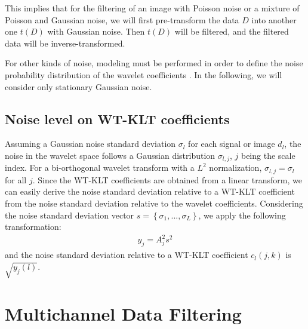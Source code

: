 This implies that for the filtering of an image with Poisson noise or
a mixture of Poisson and Gaussian noise, we will first pre-transform 
the data $D$ into another one $t(D)$ with Gaussian noise. Then $t(D)$ 
will be filtered, and the filtered data will be inverse-transformed.

For other kinds of noise, modeling must be performed in order to 
define the noise probability distribution of the wavelet coefficients 
\cite{starck:book98}.   
In the following, we will consider only stationary Gaussian noise.

\subsection{Noise level on WT-KLT coefficients}
Assuming a Gaussian noise standard deviation $\sigma_l$ for each signal 
or image $d_l$, the noise in the wavelet space follows a Gaussian distribution
$\sigma_{l,j}$, $j$ being the scale index. For a bi-orthogonal wavelet 
transform with a $L^2$ normalization, $\sigma_{l,j} = \sigma_{l}$ for all $j$.
Since the WT-KLT coefficients are obtained from a linear transform, we can
easily derive the noise standard deviation relative to a WT-KLT coefficient
from the noise standard deviation relative to the wavelet coefficients.
Considering the noise standard deviation vector  
$s = \left\{\sigma_{1}, ..., \sigma_{L} \right\}$, we apply the
following transformation:
\begin{eqnarray}
y_j = A_j^2 s^2
\end{eqnarray}
and the noise standard deviation relative to a WT-KLT coefficient 
$ c_{l}(j,k)$ is $\sqrt{y_j(l)}$. 



\section{Multichannel Data Filtering}
